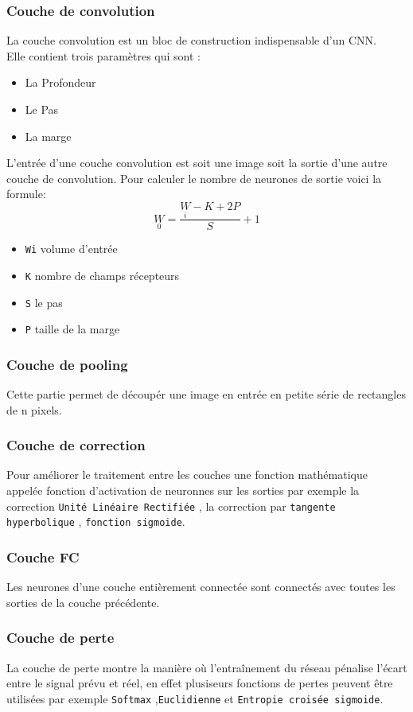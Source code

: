 \documentclass[french,a4paper,11pt,oneside]{article}
\begin{document}
{		\subsubsection{Couche de convolution}{
			La couche convolution est un bloc de construction indispensable d'un CNN.\\
			Elle contient trois paramètres qui sont :\\
			\begin{itemize}
				\item La Profondeur
				\item Le Pas
				\item La marge
			\end{itemize}
			L'entrée d'une couche convolution est soit une image soit la sortie d'une autre couche de convolution. Pour calculer le nombre de neurones de sortie voici la formule: \\
			\begin{equation}\label{key}
			\underset{0}{W}=\frac{\underset{i}{W}- K + 2P}{S} +1
			\end{equation}
			\begin{itemize}
				\item \texttt{Wi} volume d'entrée
				\item \texttt{K} nombre de champs récepteurs
				\item \texttt{S} le pas
				\item \texttt{P} taille de la marge
			\end{itemize}
			
		}
	
		\subsubsection{Couche de pooling}{
			Cette partie permet de découpér une image en entrée en petite série de rectangles de n pixels. 
		}
	
		\subsubsection{Couche de correction}{
			Pour améliorer le traitement entre les couches une fonction mathématique appelée fonction d'activation de neuronnes sur les sorties par exemple la correction \texttt{Unité Linéaire Rectifiée} , la correction par \texttt{tangente hyperbolique} , \texttt{fonction sigmoide}.	
		}
	
		\subsubsection{Couche FC}{
		Les neurones d'une couche entièrement connectée sont connectés avec toutes les sorties de la couche précédente.
		}
	
		\subsubsection{Couche de perte}{
			La couche de perte montre la manière où l'entraînement du réseau pénalise l'écart entre le signal prévu et réel, en effet plusiseurs fonctions de pertes peuvent être utilisées par exemple \texttt{Softmax} ,\texttt{Euclidienne} et \texttt{Entropie croisée sigmoide}.
		}
	}
\end{document}
